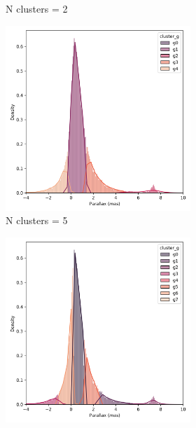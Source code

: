 \documentclass[11pt, a4paper, english]{book}
\begin{document}
\begin{figure}[htbp]
\begin{subfigure}{0.9\textwidth}
\begin{subfigure}[t]{0.3\textwidth}
      \caption{N clusters = 2}
    \end{subfigure}
    \hfill
    \begin{subfigure}[t]{0.3\textwidth}
      \centering
      \includegraphics[width=\textwidth]{../figures/kmeans/kmeans_n5_parallax_melotte_22.png}
      \caption{N clusters = 5}
    \end{subfigure}
    \hfill
    \begin{subfigure}[t]{0.3\textwidth}
      \centering
      \includegraphics[width=\textwidth]{../figures/kmeans/kmeans_n8_parallax_melotte_22.png}

\end{subfigure}
\end{subfigure}
\end{figure}
\end{document}
